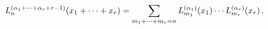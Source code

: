 \[\mathop{L^{(\alpha_{1}+\dots+\alpha_{r}+r-1)}_{n}\/}\nolimits\!\left(x_{1}+%
\dots+x_{r}\right)=\sum_{m_{1}+\dots+m_{r}=n}\mathop{L^{(\alpha_{1})}_{m_{1}}%
\/}\nolimits\!\left(x_{1}\right)\cdots\mathop{L^{(\alpha_{r})}_{m_{r}}\/}%
\nolimits\!\left(x_{r}\right).\]
